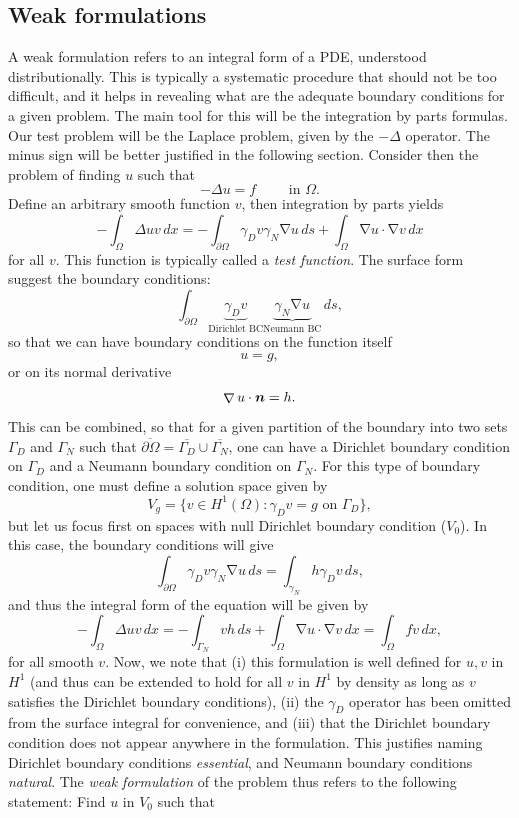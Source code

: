 \documentclass{article}
\renewcommand{\vec}{\vectorsym}
\DeclareMathOperator{\grad}{\nabla}
\begin{document}
\subsection{Weak formulations}
A weak formulation refers to an integral form of a PDE, understood distributionally. This is typically a systematic procedure that should not be too difficult, and it helps in revealing what are the adequate boundary conditions for a given problem. The main tool for this will be the integration by parts formulas. Our test problem will be the Laplace problem, given by the $-\Delta$ operator. The minus sign will be better justified in the following section. Consider then the problem of finding $u$ such that 
    $$ -\Delta u = f \qquad \text{ in $\Omega$}. $$
Define an arbitrary smooth function $v$, then integration by parts yields
    $$ - \int_\Omega \Delta u v\,dx = -\int_{\partial\Omega}\gamma_D v \gamma_N \grad u \,ds + \int_\Omega \grad u \cdot \grad v\,dx $$
for all $v$. This function is typically called a \emph{test function}. The surface form suggest the boundary conditions: 
    $$ \int_{\partial\Omega}\underbrace{\gamma_D v}_\text{Dirichlet BC} \underbrace{\gamma_N \grad u}_\text{Neumann BC} \,ds,$$
so that we can have boundary conditions on the function itself  
    $$ u = g, $$
or on its normal derivative
    $$ \grad u \cdot \vec n = h. $$
This can be combined, so that for a given partition of the boundary into two sets $\Gamma_D$ and $\Gamma_N$ such that $\overline{\partial\Omega} = \overline{\Gamma_D}\cup\overline{\Gamma_N}$, one can have a Dirichlet boundary condition on $\Gamma_D$ and a Neumann boundary condition on $\Gamma_N$. For this type of boundary condition, one must define a solution space given by 
    $$ V_g = \{v \in H^1(\Omega): \gamma_D v = g \text{ on $\Gamma_D$}\}, $$
but let us focus first on spaces with null Dirichlet boundary condition ($V_0$). In this case, the boundary conditions will give
    $$ \int_{\partial\Omega}\gamma_Dv \gamma_N \grad u\,ds = \int_{\gamma_N} h \gamma_D v\,ds, $$
and thus the integral form of the equation will be given by
    $$ -\int_\Omega\Delta u v\,dx = -\int_{\Gamma_N}v h\,ds + \int_\Omega \grad u \cdot \grad v\,dx = \int_\Omega f v\,dx, $$
for all smooth $v$. Now, we note that (i) this formulation is well defined for $u,v$ in $H^1$ (and thus can be extended to hold for all $v$ in $H^1$ by density as long as $v$ satisfies the Dirichlet boundary conditions), (ii) the $\gamma_D$ operator has been omitted from the surface integral for convenience, and (iii) that the Dirichlet boundary condition does not appear anywhere in the formulation. This justifies naming Dirichlet boundary conditions \emph{essential}, and Neumann boundary conditions \emph{natural}. The \emph{weak formulation} of the problem thus refers to the following statement: Find $u$ in $V_0$ such that
\end{document}
